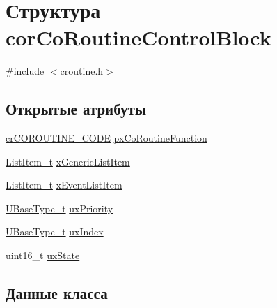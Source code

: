 \hypertarget{structcor_co_routine_control_block}{}\section{Структура cor\+Co\+Routine\+Control\+Block}
\label{structcor_co_routine_control_block}


{\ttfamily \#include $<$croutine.\+h$>$}

\subsection*{Открытые атрибуты}
\begin{DoxyCompactItemize}
\item 
\mbox{\hyperlink{croutine_8h_a397a7505718dd366d8411ce324c49758}{cr\+C\+O\+R\+O\+U\+T\+I\+N\+E\+\_\+\+C\+O\+DE}} \mbox{\hyperlink{structcor_co_routine_control_block_acc98c7364cd88e8e034a5f9bba113832}{px\+Co\+Routine\+Function}}
\item 
\mbox{\hyperlink{list_8h_a1a62d469392f9bfe2443e7efab9c8398}{List\+Item\+\_\+t}} \mbox{\hyperlink{structcor_co_routine_control_block_aa2900494db8782eeb8ef12d482501406}{x\+Generic\+List\+Item}}
\item 
\mbox{\hyperlink{list_8h_a1a62d469392f9bfe2443e7efab9c8398}{List\+Item\+\_\+t}} \mbox{\hyperlink{structcor_co_routine_control_block_a105d316da0069f766acc3b210afed1b9}{x\+Event\+List\+Item}}
\item 
\mbox{\hyperlink{portmacro_8h_a646f89d4298e4f5afd522202b11cb2e6}{U\+Base\+Type\+\_\+t}} \mbox{\hyperlink{structcor_co_routine_control_block_a752101a5d41b5caa7fd5149436613c8f}{ux\+Priority}}
\item 
\mbox{\hyperlink{portmacro_8h_a646f89d4298e4f5afd522202b11cb2e6}{U\+Base\+Type\+\_\+t}} \mbox{\hyperlink{structcor_co_routine_control_block_a6c185cd2145f562fb570bea9b158fc81}{ux\+Index}}
\item 
uint16\+\_\+t \mbox{\hyperlink{structcor_co_routine_control_block_aa0d702ff5a23c61598fe13e5a78fb1dc}{ux\+State}}
\end{DoxyCompactItemize}


\subsection{Данные класса}
\mbox{\label{structcor_co_routine_control_block_acc98c7364cd88e8e034a5f9bba113832}} 
